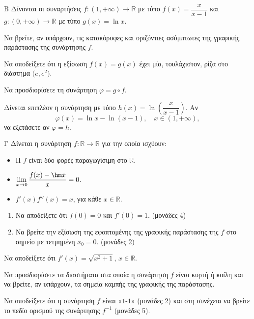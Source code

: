 \begin{thema}{Β}
Δίνονται οι συναρτήσεις $f: (1, +\infty) \to \mathbb{R}$ με τύπο $f(x) = \dfrac{x}{x-1}$ και $g: (0, +\infty) \to \mathbb{R}$ με τύπο $g(x) = \ln x$.
\begin{erwthma}
    \item Να βρείτε, αν υπάρχουν, τις κατακόρυφες και οριζόντιες ασύμπτωτες της γραφικής παράστασης της συνάρτησης $f$. 

    \item Να αποδείξετε ότι η εξίσωση $f(x) = g(x)$ έχει μία, τουλάχιστον, ρίζα στο διάστημα $\bigl(e, e^2\bigr)$. 

    \item Να προσδιορίσετε τη συνάρτηση $\varphi = g \circ f$. 

    \item Δίνεται επιπλέον η συνάρτηση με τύπο $h(x) = \ln\!\left(\dfrac{x}{x-1}\right)$. Αν
    \[
    \varphi(x) = \ln x - \ln(x-1), \quad x \in (1, +\infty),
    \]
    να εξετάσετε αν $\varphi = h$. 
\end{erwthma}
\end{thema}

\begin{thema}{Γ}
Δίνεται η συνάρτηση $f: \mathbb{R} \to \mathbb{R}$ για την οποία ισχύουν:
\begin{itemize}
    \item Η $f$ είναι δύο φορές παραγωγίσιμη στο $\mathbb{R}$.
    \item $\displaystyle\lim_{x \to 0} \dfrac{f(x) - \hm x}{x} = 0$.
    \item $f'(x)f''(x) = x$, για κάθε $x \in \mathbb{R}$.
\end{itemize}
\begin{erwthma}
    \item
    \begin{enumerate}[label=\roman*.]
        \item Να αποδείξετε ότι $f(0) = 0$ και $f'(0) = 1$. \hfill (μονάδες 4)
        \item Να βρείτε την εξίσωση της εφαπτομένης της γραφικής παράστασης της $f$ στο σημείο με τετμημένη $x_0 = 0$. \hfill (μονάδες 2)
    \end{enumerate}

    \item Να αποδείξετε ότι $f'(x) = \sqrt{x^2 + 1}$, $x \in \mathbb{R}$. 

    \item Να προσδιορίσετε τα διαστήματα στα οποία η συνάρτηση $f$ είναι κυρτή ή κοίλη και να βρείτε, αν υπάρχουν, τα σημεία καμπής της γραφικής της παράστασης. 

    \item Να αποδείξετε ότι η συνάρτηση $f$ είναι «$1$-$1$» (μονάδες 2) και στη συνέχεια να βρείτε το πεδίο ορισμού της συνάρτησης $f^{-1}$ (μονάδες 5). 
\end{erwthma}
\end{thema}

